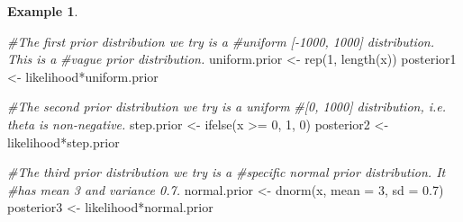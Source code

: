 \documentclass[
]{book}
\newenvironment{Shaded}{\begin{snugshade}}{\end{snugshade}}
\newcommand{\AttributeTok}[1]{\textcolor[rgb]{0.77,0.63,0.00}{#1}}
\newcommand{\CommentTok}[1]{\textcolor[rgb]{0.56,0.35,0.01}{\textit{#1}}}
\newcommand{\DecValTok}[1]{\textcolor[rgb]{0.00,0.00,0.81}{#1}}
\newcommand{\FloatTok}[1]{\textcolor[rgb]{0.00,0.00,0.81}{#1}}
\newcommand{\FunctionTok}[1]{\textcolor[rgb]{0.00,0.00,0.00}{#1}}
\newcommand{\NormalTok}[1]{#1}
\newcommand{\OtherTok}[1]{\textcolor[rgb]{0.56,0.35,0.01}{#1}}
\newcommand{\SpecialCharTok}[1]{\textcolor[rgb]{0.00,0.00,0.00}{#1}}
\theoremstyle{definition}
\theoremstyle{definition}
\newtheorem{example}{Example}[chapter]
\theoremstyle{definition}
\theoremstyle{definition}
\theoremstyle{remark}
\begin{document}
\begin{example}
\begin{Shaded}
\begin{Highlighting}[]
\CommentTok{\#The first prior distribution we try is a }
\CommentTok{\#uniform [{-}1000, 1000] distribution. This is a }
\CommentTok{\#vague prior distribution. }
\NormalTok{uniform.prior }\OtherTok{\textless{}{-}} \FunctionTok{rep}\NormalTok{(}\DecValTok{1}\NormalTok{, }\FunctionTok{length}\NormalTok{(x))}
\NormalTok{posterior1 }\OtherTok{\textless{}{-}}\NormalTok{ likelihood}\SpecialCharTok{*}\NormalTok{uniform.prior}


\CommentTok{\#The second prior distribution we try is a uniform }
\CommentTok{\#[0, 1000] distribution, i.e. theta is non{-}negative. }
\NormalTok{step.prior }\OtherTok{\textless{}{-}} \FunctionTok{ifelse}\NormalTok{(x }\SpecialCharTok{\textgreater{}=} \DecValTok{0}\NormalTok{, }\DecValTok{1}\NormalTok{, }\DecValTok{0}\NormalTok{)}
\NormalTok{posterior2 }\OtherTok{\textless{}{-}}\NormalTok{ likelihood}\SpecialCharTok{*}\NormalTok{step.prior}


\CommentTok{\#The third prior distribution we try is a}
\CommentTok{\#specific normal prior distribution. It}
\CommentTok{\#has mean 3 and variance 0.7.}
\NormalTok{normal.prior }\OtherTok{\textless{}{-}} \FunctionTok{dnorm}\NormalTok{(x, }\AttributeTok{mean =} \DecValTok{3}\NormalTok{, }\AttributeTok{sd =} \FloatTok{0.7}\NormalTok{)}
\NormalTok{posterior3 }\OtherTok{\textless{}{-}}\NormalTok{ likelihood}\SpecialCharTok{*}\NormalTok{normal.prior}


\end{Highlighting}
\end{Shaded}
\end{example}
\end{document}
